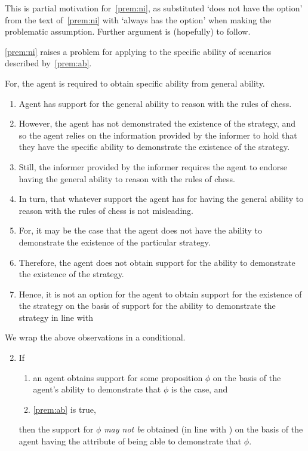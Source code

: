 \documentclass[10pt]{article}
\begin{document}
\begin{note}
  This is partial motivation for~\ref{prem:ni}, as substituted `does not have the option' from the text of~\ref{prem:ni} with `always has the option' when making the problematic assumption.
  Further argument is (hopefully) to follow.
\end{note}

\begin{note}
  \ref{prem:ni} raises a problem for applying \AR{} to the specific ability of scenarios described by~\ref{prem:ab}.

  For, the agent is required to obtain specific ability from general ability.
  \begin{enumerate}
  \item Agent has support for the general ability to reason with the rules of chess.
  \item However, the agent has not demonstrated the existence of the strategy, and so the agent relies on the information provided by the informer to hold that they have the specific ability to demonstrate the existence of the strategy.
  \item Still, the informer provided by the informer requires the agent to endorse having the general ability to reason with the rules of chess.
  \item In turn, that whatever support the agent has for having the general ability to reason with the rules of chess is not misleading.
  \item For, it may be the case that the agent does not have the ability to demonstrate the existence of the particular strategy.
  \item Therefore, the agent does not obtain support for the ability to demonstrate the existence of the strategy.
  \item Hence, it is not an option for the agent to obtain support for the existence of the strategy on the basis of support for the ability to demonstrate the strategy in line with \AR{}
  \end{enumerate}
\end{note}

\begin{note}
  We wrap the above observations in a conditional.
  \begin{enumerate}[label=(C\arabic*), ref=(C\arabic*)]
    \setcounter{enumi}{1}
  \item\label{P:ab-and-dc:A} If
    \begin{enumerate}[label=(C2\alph*), ref=(C2\alph*)]
    \item an agent obtains support for some proposition \(\phi\) on the basis of the agent's ability to demonstrate that \(\phi\) is the case, and
    \item \ref{prem:ab} is true,
    \end{enumerate}
    then the support for \(\phi\) \emph{may not be} obtained (in line with \AR{}) on the basis of the agent having the attribute of being able to demonstrate that \(\phi\).
  \end{enumerate}
\end{note}
\end{document}
